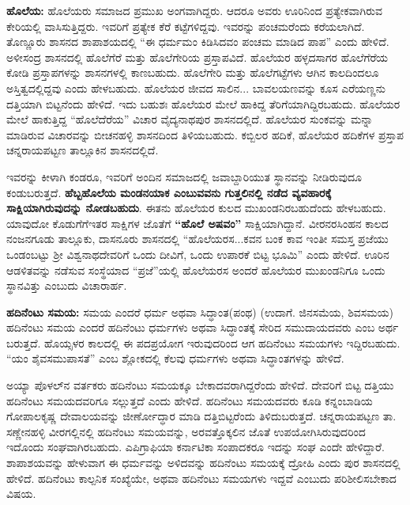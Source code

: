\textbf{ಹೊಲೆಯ:} ಹೊಲೆಯರು ಸಮಾಜದ ಪ್ರಮುಖ ಅಂಗವಾಗಿದ್ದರು. ಆದರೂ ಅವರು ಊರಿನಿಂದ ಪ್ರತ್ಯೇಕವಾಗಿರುವ ಕೇರಿಯಲ್ಲಿ ವಾಸಿಸುತ್ತಿದ್ದರು. ಇವರಿಗೆ ಪ್ರತ್ಯೇಕ ಕೆರೆ ಕಟ್ಟೆಗಳಿದ್ದವು. ಇವರನ್ನು ಪಂಚಮರೆಂದು ಕರೆಯ\-ಲಾಗಿದೆ. ತೊಣ್ಣೂರು ಶಾಸನದ ಶಾಪಾಶಯದಲ್ಲಿ “ಈ ಧರ್ಮಮಂ ಕಿಡಿಸಿದವಂ ಪಂಚಮ ಮಾಡಿದ ಪಾಪ” ಎಂದು ಹೇಳಿದೆ. ಅಳೀಸಂದ್ರ ಶಾಸನದಲ್ಲಿ ಹೊಲೆಗೆರೆ ಮತ್ತು ಹೊಲೆಗೇರಿಯ ಪ್ರಸ್ತಾಪವಿದೆ. ಹೊಲೆಯರ ಹಳ್ಳದಸಾಗರ ಹೊಲೆಗೆರೆಯ ಕೋಡಿ ಪ್ರಸ್ತಾಪಗಳನ್ನು ಶಾಸನಗಳಲ್ಲಿ ಕಾಣಬಹುದು. ಹೊಲೆಗೇರಿ ಮತ್ತು ಹೊಲೆಗಟ್ಟೆಗಳು ಆಗಿನ ಕಾಲದಿಂದಲೂ ಅಸ್ತಿತ್ವದಲ್ಲಿದ್ದವು ಎಂದು ಹೇಳಬಹುದು. ಹೊಲೆಯರ ಜೀವದ ಸಾಲಿನ... ಬಾವಲಯಣವನ್ನು ಕೂಸ ಎರೆಯಣ್ಣನು ದತ್ತಿಯಾಗಿ ಬಿಟ್ಟನೆಂದು ಹೇಳಿದೆ. ಇದು ಬಹುಶಃ ಹೊಲೆಯರ ಮೇಲೆ ಹಾಕಿದ್ದ ತೆರಿಗೆಯಾಗಿದ್ದಿರಬಹುದು. ಹೊಲೆಯರ ಮೇಲೆ ಹಾಕುತ್ತಿದ್ದ “ಹೊಲೆದೆರೆಯ” ವಿಚಾರ ವೈದ್ಯನಾಥಪುರ ಶಾಸನದಲ್ಲಿದೆ. ಹೊಲೆಯರ ಸುಂಕವನ್ನು ಮನ್ನಾ ಮಾಡಿರುವ ವಿಚಾರವನ್ನು ಬೀಚನಹಳ್ಳಿ ಶಾಸನದಿಂದ ತಿಳಿಯಬಹುದು. ಕಬ್ಬಿಲರ ಹದಿಕೆ, ಹೊಲೆಯರ ಹದಿಕೆಗಳ ಪ್ರಸ್ತಾಪ ಚನ್ನರಾಯಪಟ್ಟಣ ತಾಲ್ಲೂಕಿನ ಶಾಸನದಲ್ಲಿದೆ.

ಇವರನ್ನು ಕೀಳಾಗಿ ಕಂಡರೂ, ಇವರಿಗೆ ಅಂದಿನ ಸಮಾಜದಲ್ಲಿ ಜವಾಬ್ದಾರಿಯುತ ಸ್ಥಾನವನ್ನು ನೀಡಿರುವುದೂ ಕಂಡುಬರುತ್ತದೆ. \textbf{ಹೆಬ್ಬಹೊಲೆಯ ಮಂಡನಯಾಕ ಎಂಬುವವನು ಗುತ್ತಲಿನಲ್ಲಿ ನಡೆದ ವ್ಯವಹಾರಕ್ಕೆ ಸಾಕ್ಷಿಯಾಗಿರುವುದನ್ನು ನೋಡಬಹುದು}. ಈತನು ಹೊಲೆಯರ ಕುಲದ ಮುಖಂಡನಿರಬಹುದೆಂದು ಹೇಳಬಹುದು. ಯಾವುದೋ ಕೊಡುಗೆಗೆ\break ಇತರ ಸಾಕ್ಷಿಗಳ ಜೊತೆಗೆ \textbf{“ಹೊಲೆ ಅಷವಂ”} ಸಾಕ್ಷಿಯಾಗಿದ್ದಾನೆ. ವೀರನರಸಿಂಹನ ಕಾಲದ ನಂಜನಗೂಡು ತಾಲ್ಲೂಕು, ದಾಸನೂರು ಶಾಸನದಲ್ಲಿ “ಹೊಲೆಯರಸ...ಕವನ ಬಂಕ ಕಾವ ಇಂತೀ ಸಮಸ್ತ ಪ್ರಜೆಯು ಒಂಡಂಬಟ್ಟು ಶ‍್ರೀ ವಿಶ್ವನಾಥದೇವರಿಗೆ ಒಂದು ದೀವಿಗೆ, ಒಂದು ಉಪಾರಕೆ ಬಿಟ್ಟ ಭೂಮಿ” ಎಂದು ಹೇಳಿದೆ. ಊರಿನ ಆಡಳಿತವನ್ನು ನಡೆಸುವ ಸಂಸ್ಥೆಯಾದ “ಪ್ರಜೆ”ಯಲ್ಲಿ ಹೊಲೆಯರಸ ಅಂದರೆ ಹೊಲೆಯರ ಮುಖಂಡನಿಗೂ ಒಂದು ಸ್ಥಾನವಿತ್ತು ಎಂಬುದು ವಿಚಾರಾರ್ಹ.

\textbf{ಹದಿನೆಂಟು ಸಮಯ:} ಸಮಯ ಎಂದರೆ ಧರ್ಮ ಅಥವಾ ಸಿದ್ಧಾಂತ(ಪಂಥ) (ಉದಾಗೆ. ಜಿನಸಮೆಯ, ಶಿವಸಮಯ) ಹದಿನೆಂಟು ಸಮಯ ಎಂದರೆ ಹದಿನೆಂಟು ಧರ್ಮಗಳು ಅಥವಾ ಸಿದ್ಧಾಂತಕ್ಕೆ ಸೇರಿದ ಸಮುದಾಯದವರು ಎಂಬ ಅರ್ಥ ಬರುತ್ತದೆ. ಹೊಯ್ಸಳರ ಕಾಲದಲ್ಲಿ ಈ ಪದಪ್ರಯೋಗ ಇರುವುದರಿಂದ ಆಗ ಹದಿನೆಂಟು ಸಮಯಗಳು ಇದ್ದಿರಬಹುದು. “ಯಂ ಶೈವಸಮುಪಾಸತೆ” ಎಂಬ ಶ್ಲೋಕದಲ್ಲಿ ಕೆಲವು ಧರ್ಮಗಳು ಅಥವಾ ಸಿದ್ಧಾಂತಗಳನ್ನು ಹೇಳಿದೆ.

ಅಯ್ಯಾ ಪೊಳಲ್​ನ ವರ್ತಕರು ಹದಿನೆಂಟು ಸಮಯಕ್ಕೂ ಬೇಕಾದವರಾಗಿದ್ದರೆಂದು ಹೇಳಿದೆ. ದೇವರಿಗೆ ಬಿಟ್ಟ ದತ್ತಿಯು ಹದಿನೆಂಟು ಸಮಯದವರಿಗೂ ಸಲ್ಲುತ್ತದೆ ಎಂದು ಹೇಳಿದೆ. ಹದಿನೆಂಟು ಸಮಯದವರು ಕೂಡಿ ಕನ್ನಂಬಾಡಿಯ ಗೋಪಾಲಕೃಷ್ಣ ದೇವಾಲಯವನ್ನು ಜೀರ್ಣೋದ್ಧಾರ ಮಾಡಿ ದತ್ತಿಬಿಟ್ಟರೆಂದು ತಿಳಿದುಬರುತ್ತದೆ. ಚನ್ನರಾಯಪಟ್ಟಣ ತಾ. ಸಣ್ಣೇನಹಳ್ಳಿ ವೀರಗಲ್ಲಿನಲ್ಲಿ ಹದಿನೆಂಟು ಸಮಯವನ್ನು, ಅರವತ್ತೊಕ್ಕಲಿನ ಜೊತೆ ಉಪಯೋಗಿಸಿರುವುದರಿಂದ ಇದೊಂದು ಸಂಘವಾಗಿರಬಹುದು. ಎಪಿಗ್ರಾಫಿಯಾ ಕರ್ನಾಟಿಕಾ ಸಂಪಾದಕರೂ ಇದನ್ನು ಸಂಘ ಎಂದೇ ಹೇಳಿದ್ದಾರೆ. ಶಾಪಾಶಯವನ್ನು ಹೇಳುವಾಗ ಈ ಧರ್ಮವನ್ನು ಅಳಿದವನ್ನು ಹದಿನೆಂಟು ಸಮಯಕ್ಕೆ ದ್ರೋಹಿ ಎಂದು ಪುರ ಶಾಸನದಲ್ಲಿ ಹೇಳಿದೆ. ಹದಿನೆಂಟು ಕಾಲ್ಪನಿಕ ಸಂಖ್ಯೆಯೇ, ಅಥವಾ ಹದಿನೆಂಟು ಸಮಯಗಳು ಇದ್ದವೆ ಎಂಬುದು ಪರಿಶೀಲಿಸಬೇಕಾದ ವಿಷಯ.

